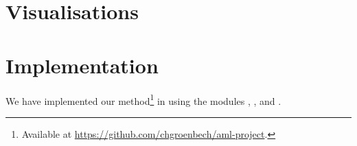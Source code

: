 \chapter{Visualisations}
\label{sec:visualisations}


\chapter{Implementation}
\label{cha:implementation}

We have implemented our method\footnote{Available at \url{https://github.com/chgroenbech/aml-project}.} in \Python using the modules \Theano, \Lasagne, and \Parmesan.
